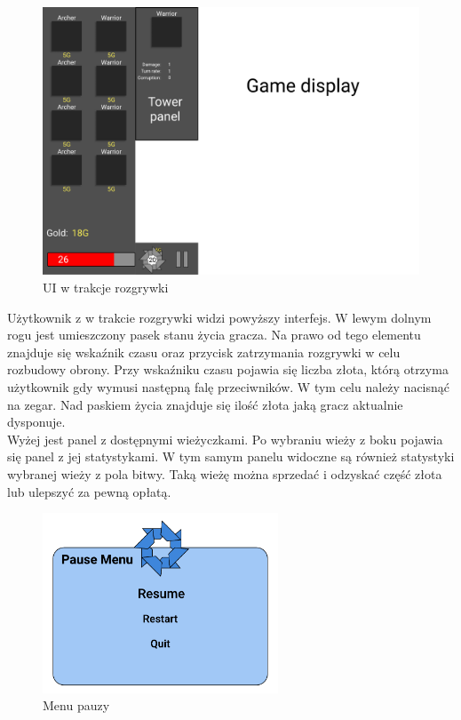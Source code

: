 \documentclass[a4paper,12pt, twoside, titlepage]{article}
\begin{document}
\begin{figure}[!htb]
	\begin{center}
		\includegraphics[width=12cm]{import/UI_Game.pdf}
	\end{center}
	\caption{UI w trakcje rozgrywki}
\end{figure}

Użytkownik z w trakcie rozgrywki widzi powyższy interfejs. W lewym dolnym rogu jest umieszczony pasek stanu życia gracza. Na prawo od tego elementu znajduje się wskaźnik czasu oraz przycisk zatrzymania rozgrywki w celu rozbudowy obrony. Przy wskaźniku czasu pojawia się liczba złota, którą otrzyma użytkownik gdy wymusi następną falę przeciwników. W tym celu należy nacisnąć na zegar. Nad paskiem życia znajduje się ilość złota jaką gracz aktualnie dysponuje.\\
Wyżej jest panel z dostępnymi wieżyczkami. Po wybraniu wieży z boku pojawia się panel z jej statystykami. W tym samym panelu widoczne są również statystyki wybranej wieży z pola bitwy. Taką wieżę można sprzedać i odzyskać część złota lub ulepszyć za pewną opłatą.
\newpage
\begin{figure}[!htb]
	\begin{center}
		\includegraphics[width=7cm]{import/PauseMenu.pdf}
	\end{center}
	\caption{Menu pauzy}
\end{figure}
\end{document}
